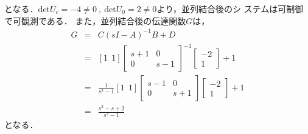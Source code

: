 \documentclass[a4paper,12pt]{jarticle}
\begin{document}
%
となる．$\mathrm{det}U_c=-4\neq0~,~\mathrm{det}U_0=2\neq0$より，並列結合後のシ
ステムは可制御で可観測である．
%
また，並列結合後の伝達関数$G$は，
%
\begin{eqnarray}
 G&=&C(sI-A)^{-1}B+D \nonumber\\
 &=&[1~~1]\left[
  \begin{array}{cc}
  s+1 &  0  \\ 
   0  & s-1    
  \end{array}
\right]^{-1}\left[
  \begin{array}{c}
   -2  \\ 
   1      
  \end{array}
\right]+1 \nonumber\\
  &=&\frac{1}{s^2-1}[1~~1]\left[
  \begin{array}{cc}
  s-1 &  0  \\ 
   0  & s+1    
  \end{array}
\right]\left[
  \begin{array}{c}
   -2  \\ 
   1      
  \end{array}
\right]+1 \nonumber\\
&=&\frac{s^2-s+2}{s^2-1}
\end{eqnarray}
%
となる．
\end{document}
